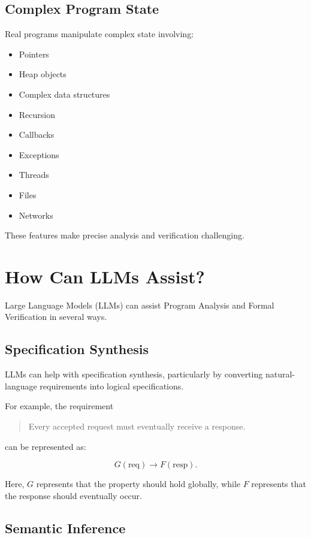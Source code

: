 \subsection{Complex Program State}

Real programs manipulate complex state involving:

\begin{itemize}
    \item Pointers
    \item Heap objects
    \item Complex data structures
    \item Recursion
    \item Callbacks
    \item Exceptions
    \item Threads
    \item Files
    \item Networks
\end{itemize}

These features make precise analysis and verification challenging.


\section{How Can LLMs Assist?}

Large Language Models (LLMs) can assist Program Analysis and Formal
Verification in several ways.

\subsection{Specification Synthesis}

LLMs can help with specification synthesis, particularly by converting
natural-language requirements into logical specifications.

For example, the requirement

\begin{quote}
Every accepted request must eventually receive a response.
\end{quote}

can be represented as:

\[
G(\text{req}) \rightarrow F(\text{resp}).
\]

Here, $G$ represents that the property should hold globally, while
$F$ represents that the response should eventually occur.

\subsection{Semantic Inference}

